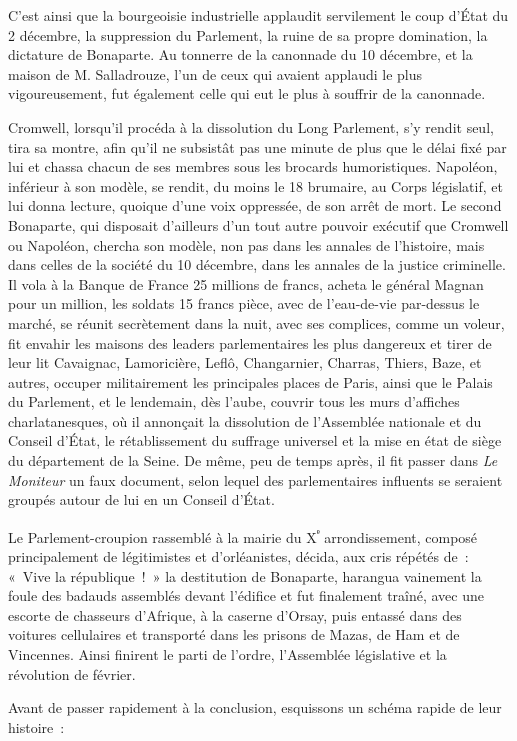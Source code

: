 \documentclass[french,twoside]{book} %
\begin{document}
\noindent C’est ainsi que la bourgeoisie industrielle applaudit servilement le coup d’État du 2 décembre, la suppression du Parlement, la ruine de sa propre domination, la dictature de Bonaparte. Au tonnerre de la canonnade du 10 décembre, et la maison de M. Salladrouze, l’un de ceux qui avaient applaudi le plus vigoureusement, fut également celle qui eut le plus à souffrir de la canonnade.\par
Cromwell, lorsqu’il procéda à la dissolution du Long Parlement, s’y rendit seul, tira sa montre, afin qu’il ne subsistât pas une minute de plus que le délai fixé par lui et chassa chacun de ses membres sous les brocards humoristiques. Napoléon, inférieur à son modèle, se rendit, du moins le 18 brumaire, au Corps législatif, et lui donna lecture, quoique d’une voix oppressée, de son arrêt de mort. Le second Bonaparte, qui disposait d’ailleurs d’un tout autre pouvoir exécutif que Cromwell ou Napoléon, chercha son modèle, non pas dans les annales de l’histoire, mais dans celles de la société du 10 décembre, dans les annales de la justice criminelle. Il vola à la Banque de France 25 millions de francs, acheta le général Magnan pour un million, les soldats 15 francs pièce, avec de l’eau-de-vie par-dessus le marché, se réunit secrètement dans la nuit, avec ses complices, comme un voleur, fit envahir les maisons des leaders parlementaires les plus dangereux et tirer de leur lit Cavaignac, Lamoricière, Leflô, Changarnier, Charras, Thiers, Baze, et autres, occuper militairement les principales places de Paris, ainsi que le Palais du Parlement, et le lendemain, dès l’aube, couvrir tous les murs d’affiches charlatanesques, où il annonçait la dissolution de l’Assemblée nationale et du Conseil d’État, le rétablissement du suffrage universel et la mise en état de siège du département de la Seine. De même, peu de temps après, il fit passer dans \emph{Le Moniteur} un faux document, selon lequel des parlementaires influents se seraient groupés autour de lui en un Conseil d’État.\par
Le Parlement-croupion rassemblé à la mairie du X\textsuperscript{ᵉ} arrondissement, composé principalement de légitimistes et d’orléanistes, décida, aux cris répétés de : « Vive la république ! » la destitution de Bonaparte, harangua vainement la foule des badauds assemblés devant l’édifice et fut finalement traîné, avec une escorte de chasseurs d’Afrique, à la caserne d’Orsay, puis entassé dans des voitures cellulaires et transporté dans les prisons de Mazas, de Ham et de Vincennes. Ainsi finirent le parti de l’ordre, l’Assemblée législative et la révolution de février.\par
Avant de passer rapidement à la conclusion, esquissons un schéma rapide de leur histoire :\par
\end{document}
